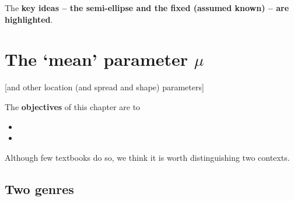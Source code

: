 \documentclass[]{book}
\begin{document}
The \textbf{key ideas -- the semi-ellipse and the fixed (assumed known) -- are highlighted}.

\hypertarget{paraMu}{%
\chapter{\texorpdfstring{The `mean' parameter \(\mu\)}{The `mean' parameter \textbackslash{}mu}}\label{paraMu}}

{[}and other location (and spread and shape) parameters{]}

The \textbf{objectives} of this chapter are to

\begin{itemize}
\item
\item
\end{itemize}

Although few textbooks do so, we think it is worth distinguishing two contexts.

\hypertarget{two-genres}{%
\section{Two genres}\label{two-genres}}
\end{document}
